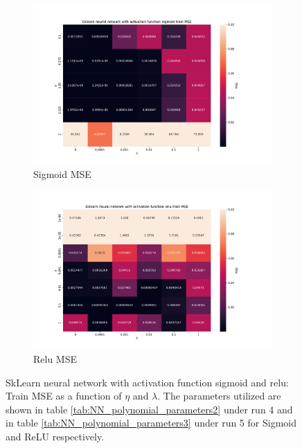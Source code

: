 \begin{figure}[htpb]
\begin{subfigure}{.5\textwidth}
  \centering
  \includegraphics[width=1.1\linewidth]{Figures/PartB/train_sklearn_sigmoid_NN_MSE(eta,lmb)}
  \caption{Sigmoid MSE}
  \label{fig:sklearn_sigmoid_MSE-eta-lmb-}
\end{subfigure}%
\begin{subfigure}{.5\textwidth}
  \centering
  \includegraphics[width=1.1\linewidth]{Figures/PartB/train_sklearn_relu_NN_MSE(eta,lmb)}
  \caption{Relu MSE}
  \label{fig:sklearn_relu_MSE-eta-lmb-}
\end{subfigure}
\caption{SkLearn neural network with activation function sigmoid and relu: Train MSE as a function of \(\eta \) and \(\lambda \).
 The parameters utilized are shown in table \ref{tab:NN_polynomial_parameters2} under run 4 and in table \ref{tab:NN_polynomial_parameters3}
 under run 5 for Sigmoid and ReLU respectively.}
\label{fig:sklearn_MSE}
\end{figure}

